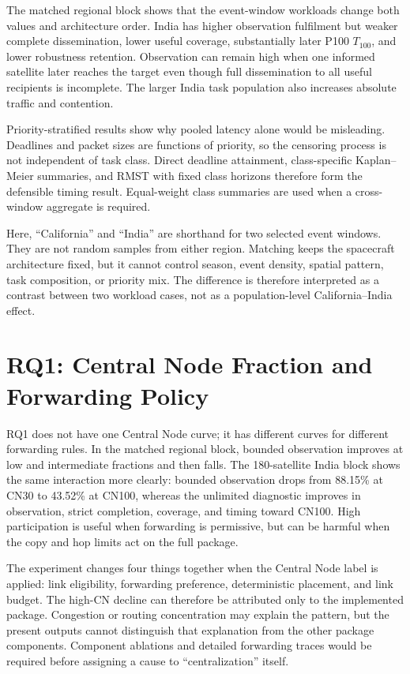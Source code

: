 The matched regional block shows that the event-window workloads change both values and architecture order. India has higher observation fulfilment but weaker complete dissemination, lower useful coverage, substantially later P100 $T_{100}$, and lower robustness retention. Observation can remain high when one informed satellite later reaches the target even though full dissemination to all useful recipients is incomplete. The larger India task population also increases absolute traffic and contention.

Priority-stratified results show why pooled latency alone would be misleading. Deadlines and packet sizes are functions of priority, so the censoring process is not independent of task class. Direct deadline attainment, class-specific Kaplan--Meier summaries, and RMST with fixed class horizons therefore form the defensible timing result. Equal-weight class summaries are used when a cross-window aggregate is required.

Here, ``California'' and ``India'' are shorthand for two selected event windows. They are not random samples from either region. Matching keeps the spacecraft architecture fixed, but it cannot control season, event density, spatial pattern, task composition, or priority mix. The difference is therefore interpreted as a contrast between two workload cases, not as a population-level California--India effect.

\section{RQ1: Central Node Fraction and Forwarding Policy}

RQ1 does not have one Central Node curve; it has different curves for different forwarding rules. In the matched regional block, bounded observation improves at low and intermediate fractions and then falls. The 180-satellite India block shows the same interaction more clearly: bounded observation drops from 88.15\% at CN30 to 43.52\% at CN100, whereas the unlimited diagnostic improves in observation, strict completion, coverage, and timing toward CN100. High participation is useful when forwarding is permissive, but can be harmful when the copy and hop limits act on the full package.

The experiment changes four things together when the Central Node label is applied: link eligibility, forwarding preference, deterministic placement, and link budget. The high-CN decline can therefore be attributed only to the implemented package. Congestion or routing concentration may explain the pattern, but the present outputs cannot distinguish that explanation from the other package components. Component ablations and detailed forwarding traces would be required before assigning a cause to ``centralization'' itself.

